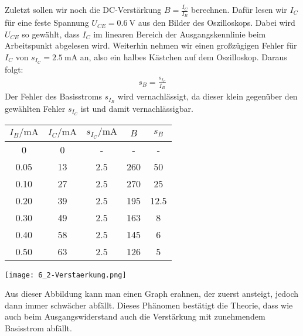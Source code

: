 Zuletzt sollen wir noch die DC-Verst\"arkung $B=\frac{I_C}{I_B}$ berechnen. Dafür lesen wir $I_C$ für eine feste Spannung $U_{CE}=0.6~\text{V}$ aus den Bilder des Oszilloskops. Dabei wird $U_{CE}$ so gewählt, dass $I_C$ im linearen Bereich der Ausgangskennlinie beim Arbeitspunkt abgelesen wird. Weiterhin nehmen wir einen großzügigen Fehler für $I_C$ von $s_{I_C}=2.5~\text{mA}$ an, also ein halbes Kästchen auf dem Oszilloskop.  Daraus folgt:
\begin{align}
    s_B=\frac{s_{I_C}}{I_B}
\end{align}
Der Fehler des Basisstroms $s_{I_B}$ wird vernachlässigt, da dieser klein gegenüber den gewählten Fehler $s_{I_C}$ ist und damit vernachlässigbar.
\begin{center}
    \begin{tabular}{ccccc}
        $I_B/\text{mA}$ & $I_C/\text{mA}$ & $s_{I_C}/\text{mA}$ & $B$ & $s_B$ \\
        \hline
        0     & 0     & -   & -   & - \\
        0.05  & 13    & 2.5   & 260   & 50 \\
        0.10   & 27    & 2.5   & 270   & 25 \\
        0.20   & 39    & 2.5   & 195   & 12.5 \\
        0.30   & 49    & 2.5   & 163   & 8 \\
        0.40   & 58    & 2.5   & 145   & 6 \\
        0.50   & 63    & 2.5   & 126   & 5 \\
        \end{tabular}
\end{center}
\begin{center}
    \texttt{[image: 6\_2-Verstaerkung.png]}
\end{center}
Aus dieser Abbildung kann man einen Graph erahnen, der zuerst ansteigt, jedoch dann immer schw\"acher abf\"allt. Dieses Ph\"anomen best\"atigt die Theorie, dass wie auch beim Ausgangswiderstand auch die Verst\"arkung mit zunehmendem Basisstrom abf\"allt. \\